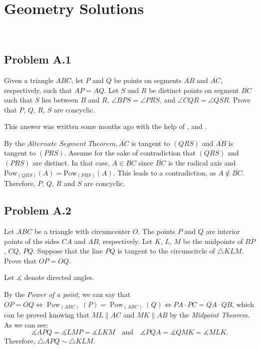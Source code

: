 \documentclass[12pt]{article}
\newcommand{\cmark}{\textcolor{color5}{\ding{51}}} %
\begin{document}
    \clearpage

  \section{\textsf{Geometry Solutions}}
    \
    \subsection{Problem A.1 \cmark}
      \begin{tcolorbox}[problembox=Problem statement]
        Given a triangle $ABC$, let $P$ and $Q$ be points on segments $\overline{AB}$ and $\overline{AC}$,
        respectively, such that $AP = AQ$. Let $S$ and $R$ be distinct points on segment $\overline{BC}$
        such that $S$ lies between $B$ and $R$, $\angle BPS = \angle PRS$, and $\angle CQR = \angle QSR$.
        Prove that $P$, $Q$, $R$, $S$ are concyclic.
      \end{tcolorbox}
      This answer was written some months ago with the help of \cite{noic}, \cite{obm} and \cite{evan1}.

      By the $\textit{Alternate Segment Theorem}, \overline{AC}$ is tangent to $(QRS)$ and $\overline{AB}$
      is tangent to $(PRS)$. Assume for the sake of contradiction that $(QRS)$ and $(PRS)$ are distinct. In that case,
      $A \in \overline{BC}$ since $\overline{BC}$ is the radical axis and $\text{Pow}_{(QRS)}(A) =
      \text{Pow}_{(PRS)}(A)$. This leads to a contradiction, as $A \notin \overline{BC}$. Therefore,
      $P$, $Q$, $R$ and $S$ are concyclic.

    \clearpage

    \subsection{Problem A.2 \cmark}
      \begin{tcolorbox}[problembox]
        Let $ABC$ be a triangle with circumcenter $O$. The points $P$ and $Q$ are interior points of the sides $CA$
        and $AB$, respectively. Let $K$, $L$, $M$ be the midpoints of $BP$, $CQ$, $PQ$. Suppose that the line $PQ$ is tangent to the circumcircle 
        of $\triangle KLM$. Prove that $OP = OQ$.
      \end{tcolorbox}
      Let $\measuredangle$ denote directed angles. 

      By the \textit{Power of a point}, we can say that $OP = OQ \iff \operatorname{Pow}_{(ABC)}(P) =
      \operatorname{Pow}_{(ABC)}(Q) \iff PA \cdot PC = QA \cdot QB$, which can be
      proved knowing that $ML \parallel AC$ and $MK \parallel AB$ by the \textit{Midpoint Theorem}. As we can see:
      \[
        \measuredangle APQ = \measuredangle LMP = \measuredangle LKM \quad \text{and} \quad \measuredangle PQA = \measuredangle QMK = \measuredangle MLK.
      \]
      Therefore, $\triangle APQ \sim \triangle KLM$.
\end{document}
